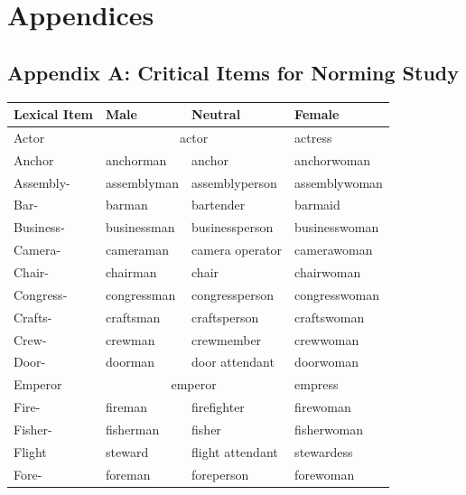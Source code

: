\documentclass{article}
\begin{document}
	\newpage
	
	\section*{Appendices}
	
	\subsection*{Appendix A: Critical Items for Norming Study}
	
	\begin{table}[h!]
		\centering
		\begin{tabular}{|l|l|l|l|}
			\hline
			\textbf{Lexical Item} & \textbf{Male} & \textbf{Neutral} & \textbf{Female} \\
			\hline
			Actor & \multicolumn{2}{c|}{actor} & actress \\
			\hline
			Anchor & anchorman & anchor & anchorwoman \\
			\hline
			Assembly- & assemblyman & assemblyperson & assemblywoman \\
			\hline
			Bar- & barman & bartender & barmaid \\
			\hline
			Business- & businessman & businessperson & businesswoman \\
			\hline
			Camera- & cameraman & camera operator & camerawoman \\
			\hline
			Chair- & chairman & chair & chairwoman \\
			\hline
			Congress- & congressman & congressperson & congresswoman \\
			\hline 
			Crafts- & craftsman & craftsperson & craftswoman \\
			\hline 
			Crew- & crewman & crewmember & crewwoman \\
			\hline
			Door- & doorman & door attendant & doorwoman \\
			\hline
			Emperor & \multicolumn{2}{c|}{emperor} & empress \\
			\hline 
			Fire- & fireman & firefighter & firewoman \\
			\hline
			Fisher- & fisherman & fisher & fisherwoman \\
			\hline
			Flight & steward & flight attendant & stewardess \\
			\hline
			Fore- & foreman & foreperson & forewoman \\

\end{tabular}
\end{table}
\end{document}
